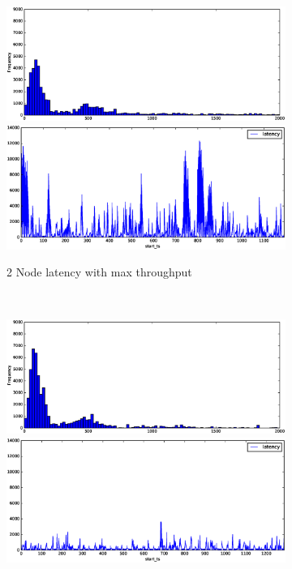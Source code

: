 \begin{figure}
    \centering
    \begin{subfigure}[b]{0.23\textwidth}
        \includegraphics[width=\textwidth]{eps/flink_agg_2node_th_max_hist}
         \includegraphics[width=\textwidth]{eps/flink_agg_2node_th_max_ts}

        \caption{2 Node latency with max throughput}
    \end{subfigure}
    ~ 
    \begin{subfigure}[b]{0.23\textwidth}
        \includegraphics[width=\textwidth]{eps/flink_agg_2node_th_90_hist}
         \includegraphics[width=\textwidth]{eps/flink_agg_2node_th_90_ts}


\end{subfigure}
\end{figure}
